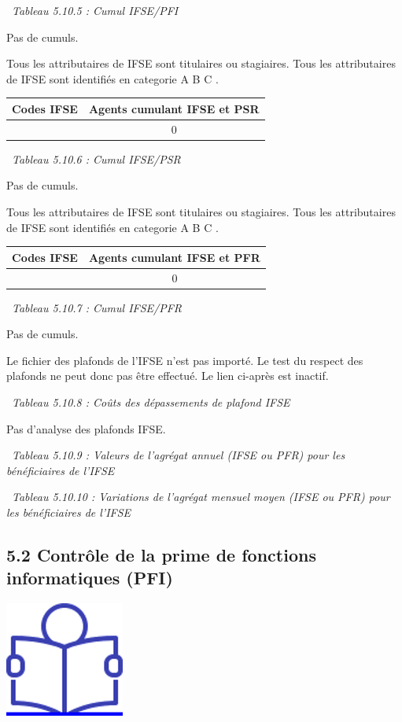 ~\emph{Tableau 5.10.5 : Cumul IFSE/PFI}

Pas de cumuls.

Tous les attributaires de IFSE sont titulaires ou stagiaires. Tous les
attributaires de IFSE sont identifiés en categorie A B C .

\begin{longtable}[]{@{}cc@{}}
\toprule
Codes IFSE & Agents cumulant IFSE et PSR\tabularnewline
\midrule
\endhead
& 0\tabularnewline
\bottomrule
\end{longtable}

~\emph{Tableau 5.10.6 : Cumul IFSE/PSR}

Pas de cumuls.

Tous les attributaires de IFSE sont titulaires ou stagiaires. Tous les
attributaires de IFSE sont identifiés en categorie A B C .

\begin{longtable}[]{@{}cc@{}}
\toprule
Codes IFSE & Agents cumulant IFSE et PFR\tabularnewline
\midrule
\endhead
& 0\tabularnewline
\bottomrule
\end{longtable}

~\emph{Tableau 5.10.7 : Cumul IFSE/PFR}

Pas de cumuls.

Le fichier des plafonds de l'IFSE n'est pas importé. Le test du respect
des plafonds ne peut donc pas être effectué. Le lien ci-après est
inactif.

~\emph{Tableau 5.10.8 : Coûts des dépassements de plafond IFSE}

Pas d'analyse des plafonds IFSE.

~\emph{Tableau 5.10.9 : Valeurs de l'agrégat annuel (IFSE ou PFR) pour
les bénéficiaires de l'IFSE}

~\emph{Tableau 5.10.10 : Variations de l'agrégat mensuel moyen (IFSE ou
PFR) pour les bénéficiaires de l'IFSE}

\hypertarget{controle-de-la-prime-de-fonctions-informatiques-pfi}{%
\subsection{5.2 Contrôle de la prime de fonctions informatiques
(PFI)}\label{controle-de-la-prime-de-fonctions-informatiques-pfi}}

\href{../Docs/Notices/fiche_PFI.odt}{\includegraphics{icones/Notice.png}}

